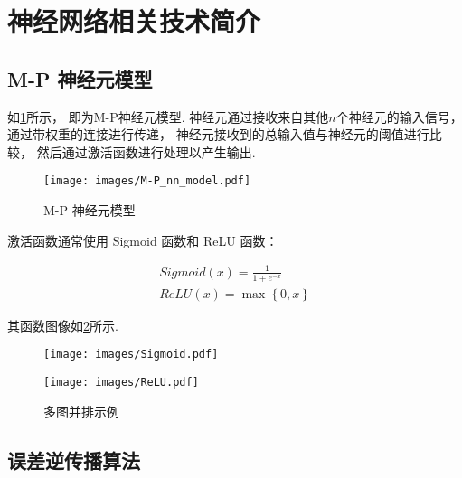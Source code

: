 \section{神经网络相关技术简介}

\subsection{M-P 神经元模型}

如\cref{fig:M-P}所示，
即为M-P神经元模型.
神经元通过接收来自其他$n$个神经元的输入信号，
通过带权重的连接进行传递，
神经元接收到的总输入值与神经元的阈值进行比较，
然后通过激活函数进行处理以产生输出\cite{zhouzhihuaJiQiXueXi}.

\begin{figure}[!h]
    \centering
    \texttt{[image: images/M-P\_nn\_model.pdf]}
    \caption{M-P 神经元模型}\label{fig:M-P}
\end{figure}

激活函数通常使用 Sigmoid 函数和 ReLU 函数：

\begin{equation}
    \label{eq:sigmoid}
    \begin{aligned}
        Sigmoid\left(x\right) = \frac{1}{1+e^{-x}} \\
        ReLU\left(x\right) = \max\left\{0, x\right\}
    \end{aligned}
\end{equation}

其函数图像如\cref{fig:active-func}所示.

\begin{figure}
    \centering
    \begin{minipage}[b]{0.45\textwidth}
        \centering
        \texttt{[image: images/Sigmoid.pdf]}
        \label{fig:sigmoid}
    \end{minipage}
    \begin{minipage}[b]{0.45\textwidth}
        \centering
        \texttt{[image: images/ReLU.pdf]}
        \label{fig:ReLu}
    \end{minipage}
    \caption{多图并排示例}
    \label{fig:active-func}
\end{figure}

\subsection{误差逆传播算法}

